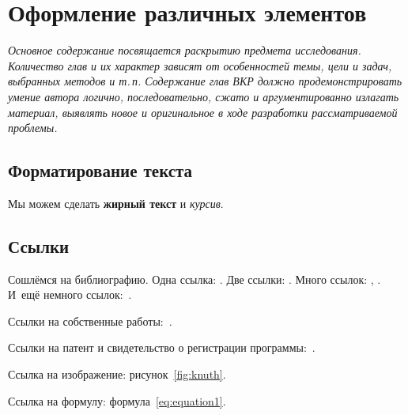 \begingroup
  \let\clearpage\relax                        %
  \par\vspace{3ex}                            %
  \chapter{Оформление различных элементов}\label{ch:ch1}
\endgroup

\textit{Основное содержание посвящается раскрытию предмета исследования.
Количество глав и их характер зависят от особенностей темы, цели и задач, выбранных методов и т.\,п.
Содержание глав ВКР должно продемонстрировать умение автора логично, последовательно, сжато и аргументированно излагать материал, выявлять новое и оригинальное в ходе разработки рассматриваемой проблемы.}

\vspace{2ex}

\section{Форматирование текста}\label{sec:ch1/sec1}

Мы можем сделать \textbf{жирный текст} и \textit{курсив}.

\section{Ссылки}\label{sec:ch1/sec2}

Сошлёмся на библиографию.
Одна ссылка: \cite[с.~54]{Sokolov}.
Две ссылки: \cite{Sokolov, Gaidaenko}.
Много ссылок: \cite{Gost.7.0.53, Razumovski, Lagkueva, Pokrovski, Methodology, Berestova, Kriger},
\cite{Sirotko, Lukina, Encyclopedia, Nasirova}.
И~ещё немного ссылок:~\cite{Article,Book,Booklet,Conference,Inbook,Incollection,Manual,Mastersthesis,Misc,Phdthesis,Proceedings,Techreport,Unpublished}.


Ссылки на собственные работы:~\cite{bib2, bib3, confbib1}.

Ссылки на патент и свидетельство о регистрации программы:~\cite{patbib1, progbib1}.

Ссылка на изображение: рисунок~\cref{fig:knuth}.

Ссылка на формулу: формула~\cref{eq:equation1}.

